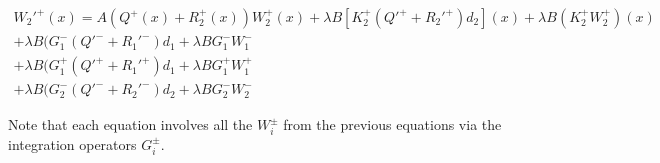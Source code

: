 \documentclass[12pt]{article}
\begin{document}
\begin{multline}
W_2'^+(x) = A(Q^+(x) + R_2^+(x))W_2^+(x) + \lambda B [K_2^+ (Q'^+ + R_2'^+)d_2](x) + \lambda B (K_2^+ W_2^+)(x)\\
+ \lambda B ( G_1^-(Q'^- + R_1'^-)d_1 + \lambda B G_1^- W_1^-\\
+ \lambda B ( G_1^+(Q'^+ + R_1'^+)d_1 + \lambda B G_1^+ W_1^+\\
+ \lambda B ( G_2^-(Q'^- + R_2'^-)d_2 + \lambda B G_2^- W_2^-
\end{multline}

Note that each equation involves all the $W_i^\pm$ from the previous equations via the integration operators $G_i^\pm$. 
\end{document}
